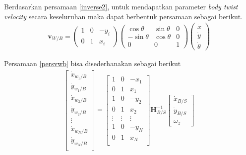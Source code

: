 Berdasarkan persamaan \eqref{inverse2}, untuk mendapatkan parameter \textit{body twist velocity} secara keseluruhan maka dapat berbentuk persamaan sebagai berikut.
\begin{eqnarray}
    \mathbf{v}_{W/B} = \begin{pmatrix}
            1 & 0 & -y_i\\
            0&1&x_i
        \end{pmatrix}
        \begin{pmatrix}
            \cos{\theta} & \sin{\theta} & 0 \\ -\sin{\theta} & \cos{\theta} & 0 \\ 0& 0 & 1
        \end{pmatrix}
        \begin{pmatrix}
            \dot{x}\\
            \dot{y}\\
            \dot{\theta}
        \end{pmatrix}\label{persvwb}
\end{eqnarray}

Persamaan \eqref{persvwb} bisa disederhanakan sebagai berikut 
\begin{eqnarray}
        \begin{bmatrix}
            \dot{x}_{{w_1/B}}\\
            \dot{y}_{{w_1/B}}\\
            \dot{x}_{{w_2/B}}\\
            \dot{y}_{{w_2/B}}\\
            \vdots\\
            \dot{x}_{{w_N/B}}\\
            \dot{y}_{{w_N/B}}\\
        \end{bmatrix}
        =
        \begin{bmatrix}
            1&0&-x_1\\
            0&1&x_1\\
            1&0&-y_2\\
            0&1&x_2\\
            \vdots&\vdots&\vdots\\
            1&0&-y_N\\
            0&1&x_N\\
        \end{bmatrix}
        \mathbf{H}_{B/S}^{-1}
        \begin{bmatrix}
            \dot{x}_{B/S}\\
            \dot{y}_{B/S}\\
            \omega_z
        \end{bmatrix} \label{persN}
    \end{eqnarray}

